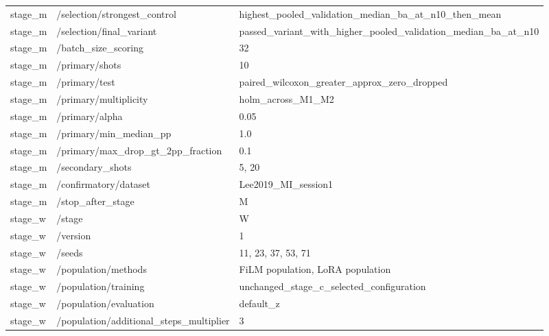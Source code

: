 \begin{longtable}{p{.65in}p{2.8in}p{3.2in}}
stage\_\allowbreak{}m & /selection/strongest\_\allowbreak{}control & highest\_\allowbreak{}pooled\_\allowbreak{}validation\_\allowbreak{}median\_\allowbreak{}ba\_\allowbreak{}at\_\allowbreak{}n10\_\allowbreak{}then\_\allowbreak{}mean \\
stage\_\allowbreak{}m & /selection/final\_\allowbreak{}variant & passed\_\allowbreak{}variant\_\allowbreak{}with\_\allowbreak{}higher\_\allowbreak{}pooled\_\allowbreak{}validation\_\allowbreak{}median\_\allowbreak{}ba\_\allowbreak{}at\_\allowbreak{}n10 \\
stage\_\allowbreak{}m & /batch\_\allowbreak{}size\_\allowbreak{}scoring & 32 \\
stage\_\allowbreak{}m & /primary/shots & 10 \\
stage\_\allowbreak{}m & /primary/test & paired\_\allowbreak{}wilcoxon\_\allowbreak{}greater\_\allowbreak{}approx\_\allowbreak{}zero\_\allowbreak{}dropped \\
stage\_\allowbreak{}m & /primary/multiplicity & holm\_\allowbreak{}across\_\allowbreak{}M1\_\allowbreak{}M2 \\
stage\_\allowbreak{}m & /primary/alpha & 0.05 \\
stage\_\allowbreak{}m & /primary/min\_\allowbreak{}median\_\allowbreak{}pp & 1.0 \\
stage\_\allowbreak{}m & /primary/max\_\allowbreak{}drop\_\allowbreak{}gt\_\allowbreak{}2pp\_\allowbreak{}fraction & 0.1 \\
stage\_\allowbreak{}m & /secondary\_\allowbreak{}shots & 5, 20 \\
stage\_\allowbreak{}m & /confirmatory/dataset & Lee2019\_\allowbreak{}MI\_\allowbreak{}session1 \\
stage\_\allowbreak{}m & /stop\_\allowbreak{}after\_\allowbreak{}stage & M \\
stage\_\allowbreak{}w & /stage & W \\
stage\_\allowbreak{}w & /version & 1 \\
stage\_\allowbreak{}w & /seeds & 11, 23, 37, 53, 71 \\
stage\_\allowbreak{}w & /population/methods & FiLM population, LoRA population \\
stage\_\allowbreak{}w & /population/training & unchanged\_\allowbreak{}stage\_\allowbreak{}c\_\allowbreak{}selected\_\allowbreak{}configuration \\
stage\_\allowbreak{}w & /population/evaluation & default\_\allowbreak{}z \\
stage\_\allowbreak{}w & /population/additional\_\allowbreak{}steps\_\allowbreak{}multiplier & 3 \\

\end{longtable}
